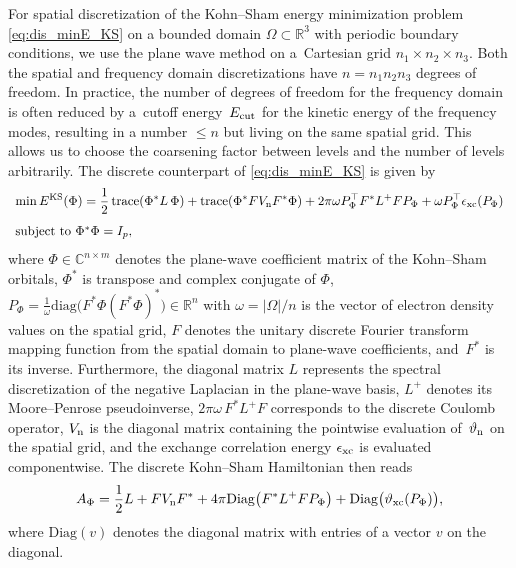\documentclass[11pt,reqno]{amsart}
\theoremstyle{plain}
\newcommand\C{\mathbb C}
\newcommand\R{\mathbb R}
\DeclareMathOperator{\trace}{trace}
\begin{document}
	For spatial discretization of the Kohn--Sham energy minimization problem \eqref{eq:dis_minE_KS} on a bounded domain $\Omega \subset\R^3$ with periodic boundary conditions, we use the plane wave method on a~Cartesian grid $n_1\times n_2 \times n_3$. Both the spatial and frequency domain discretizations have $n = n_1n_2n_3$ degrees of freedom. In practice, the number of degrees of freedom for the frequency domain is often reduced by a~cutoff energy~$E_{\rm cut}$ for the kinetic energy of the frequency modes, resulting in a number $\le n$ but living on the same spatial grid. This allows us to choose the coarsening factor between levels and the number of levels arbitrarily. The discrete counterpart of \eqref{eq:dis_minE_KS} is given by
	\begin{equation}\label{eq:minE_KS}
		\begin{array}{l}
			\displaystyle{    \min E^{\rm KS}(\Phi) 
				= \frac{1}{2} \trace (\Phi^{\ast} L\, \Phi) + \trace( \Phi^{\ast}  F V_{\rm n} F^{\ast} \Phi)  + 2 \pi \omega P_\Phi^\top F^{\ast}L^+FP_\Phi 
				+ \omega P_\Phi^\top\epsilon_{\rm xc}(P_{\Phi})
			} \\[4mm]
			\text{subject to } \Phi^{\ast} \Phi = I_p,
		\end{array}
	\end{equation}
	where $\Phi\in\C^{n\times m}$ denotes the plane-wave coefficient matrix of the Kohn--Sham orbitals, 
	$\Phi^{\ast}$ is transpose and complex conjugate of $\Phi$, 
	$P_\Phi  = \frac{1}{\omega}\mathrm{diag}\big(F^{\ast}\Phi (F^{\ast}\Phi)^{\ast}\big) \in \R^n$ with $\omega = |\Omega|/n$ is the vector of electron density values on the spatial grid,  
	$F$ denotes the unitary discrete Fourier transform mapping function from the spatial domain to plane-wave coefficients, and~$F^{\ast}$ is its inverse. 
	Furthermore, the diagonal matrix $L$ represents the spectral discretization of the negative Laplacian in the plane-wave basis, $L^+$ denotes its Moore–Penrose pseudoinverse, 
	$2\pi \omega\, F^{\ast}L^+F$ corresponds to the discrete Coulomb operator, 
	$V_{\rm n}$ is the diagonal matrix containing the pointwise evaluation of~$\vartheta_{\rm n}$ on the spatial grid, 
	and the exchange correlation energy $\epsilon_{\rm xc}$ is evaluated componentwise. The discrete Kohn--Sham Hamiltonian then reads
	\[
	A_{\Phi} = \frac{1}{2}L +  FV_{\rm n}F^{\ast} + 4\pi \mathrm{Diag}\big(F^{\ast} L^+F P_\Phi\big) 
	+\mathrm{Diag}\big(\vartheta_{\rm xc}(P_\Phi)\big),
	\]
	where $\mathrm{Diag}(v)$ denotes the diagonal matrix with entries of a vector $v$ on the diagonal. 
	
\end{document}

